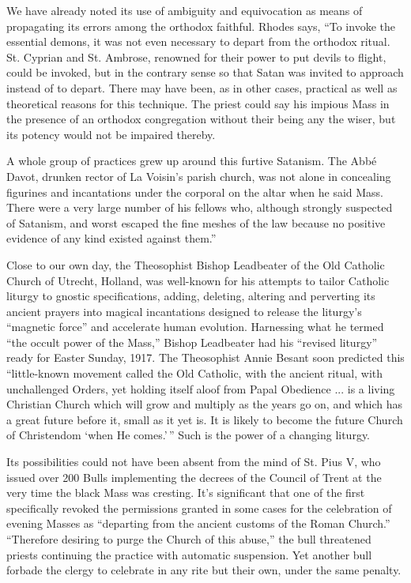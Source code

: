 We have already noted its use of ambiguity and equivocation as means of propagating its errors among the orthodox faithful. Rhodes says, ``To invoke the essential demons, it was not even necessary to depart from the orthodox ritual. St. Cyprian and St. Ambrose, renowned for their power to put devils to flight, could be invoked, but in the contrary sense so that Satan was invited to approach instead of to depart. There may have been, as in other cases, practical as well as theoretical reasons for this technique. The priest could say his impious Mass in the presence of an orthodox congregation without their being any the wiser, but its potency would not be impaired thereby.

A whole group of practices grew up around this furtive Satanism. The Abbé Davot, drunken rector of La Voisin's parish church, was not alone in concealing figurines and incantations under the corporal on the altar when he said Mass. There were a very large number of his fellows who, although strongly suspected of Satanism, and worst escaped the fine meshes of the law because no positive evidence of any kind existed against them.''

Close to our own day, the Theosophist Bishop Leadbeater of the Old Catholic Church of Utrecht, Holland, was well-known for his attempts to tailor Catholic liturgy to gnostic specifications, adding, deleting, altering and perverting its ancient prayers into magical incantations designed to release the liturgy's ``magnetic force'' and accelerate human evolution. Harnessing what he termed ``the occult power of the Mass,'' Bishop Leadbeater had his ``revised liturgy'' ready for Easter Sunday, 1917. The Theosophist Annie Besant soon predicted this ``little-known movement called the Old Catholic, with the ancient ritual, with unchallenged Orders, yet holding itself aloof from Papal Obedience ... is a living Christian Church which will grow and multiply as the years go on, and which has a great future before it, small as it yet is. It is likely to become the future Church of Christendom `when He comes.'\,'' Such is the power of a changing liturgy.

Its possibilities could not have been absent from the mind of St. Pius V, who issued over 200 Bulls implementing the decrees of the Council of Trent at the very time the black Mass was cresting. It's significant that one of the first specifically revoked the permissions granted in some cases for the celebration of evening Masses as ``departing from the ancient customs of the Roman Church.'' ``Therefore desiring to purge the Church of this abuse,'' the bull threatened priests continuing the practice with automatic suspension. Yet another bull forbade the clergy to celebrate in any rite but their own, under the same penalty.

